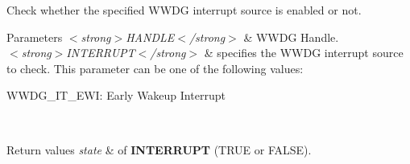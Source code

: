 Check whether the specified W\+W\+DG interrupt source is enabled or not. 


\begin{DoxyParams}{Parameters}
{\em $<$strong$>$\+H\+A\+N\+D\+L\+E$<$/strong$>$} & W\+W\+DG Handle. \\
\hline
{\em $<$strong$>$\+I\+N\+T\+E\+R\+R\+U\+P\+T$<$/strong$>$} & specifies the W\+W\+DG interrupt source to check. This parameter can be one of the following values\+: \begin{DoxyItemize}
\item W\+W\+D\+G\+\_\+\+I\+T\+\_\+\+E\+WI\+: Early Wakeup Interrupt \end{DoxyItemize}
\\
\hline
\end{DoxyParams}

\begin{DoxyRetVals}{Return values}
{\em state} & of {\bfseries I\+N\+T\+E\+R\+R\+U\+PT} (T\+R\+UE or F\+A\+L\+SE). \\
\hline
\end{DoxyRetVals}
